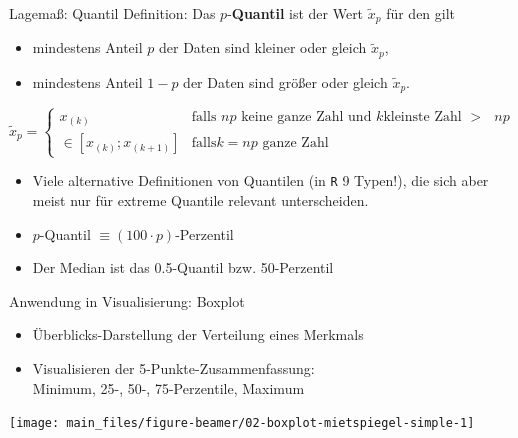 \documentclass[
  10pt,
  ignorenonframetext,
]{beamer}
\providecommand{\tightlist}{%
  \setlength{\itemsep}{0pt}\setlength{\parskip}{0pt}}
\begin{document}
\begin{frame}[fragile]{Lagemaß: Quantil}
\label{lagemauxdf-quantil}
Definition: Das \(p\)-\textbf{Quantil} ist der Wert \(\tilde x_p\) für
den gilt

\begin{itemize}
\tightlist
\item
  mindestens Anteil \(p\) der Daten sind kleiner oder gleich
  \(\tilde x_p\),
\item
  mindestens Anteil \(1-p\) der Daten sind größer oder gleich
  \(\tilde x_p\).
\end{itemize}

\begin{equation*}
 \tilde x_{p} = \left\{ \begin{array}{ll}
                      x_{(k)} & \text{falls $np$ keine ganze Zahl und $k$
kleinste Zahl $>$ $np$} \\
                      \in \left[x_{(k)} ; x_{(k+1)}\right] & \text{falls
$k=np$ ganze Zahl}
                  \end{array}\right.
\end{equation*}

\begin{itemize}
\tightlist
\item
  Viele alternative Definitionen von Quantilen (in \texttt{R} 9 Typen!),
  die sich aber meist nur für extreme Quantile relevant unterscheiden.
\item
  \(p\)-Quantil \(\equiv (100\cdot p)\)-Perzentil
\item
  Der Median ist das 0.5-Quantil bzw. 50-Perzentil
\end{itemize}
\end{frame}

\begin{frame}{Anwendung in Visualisierung: Boxplot}
\label{anwendung-in-visualisierung-boxplot}
\begin{itemize}
\tightlist
\item
  Überblicks-Darstellung der Verteilung eines Merkmals
\item
  Visualisieren der 5-Punkte-Zusammenfassung:\\
  Minimum, 25-, 50-, 75-Perzentile, Maximum
\end{itemize}

\scriptsize

\begin{center}\texttt{[image: main\_files/figure-beamer/02-boxplot-mietspiegel-simple-1]} \end{center}

\normalsize
\end{frame}
\end{document}
